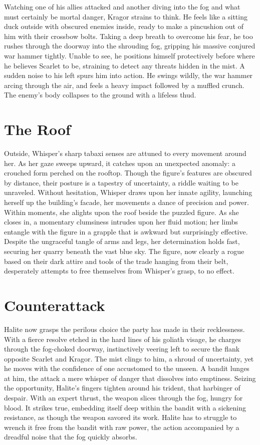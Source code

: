 \documentclass[
  12pt,twoside,twocolumn,openany,nodeprecatedcode]{dndbook}
\begin{document}
Watching one of his allies attacked and another diving into the fog and
what must certainly be mortal danger, Kragor strains to think. He feels
like a sitting duck outside with obscured enemies inside, ready to make
a pincushion out of him with their crossbow bolts. Taking a deep breath
to overcome his fear, he too rushes through the doorway into the
shrouding fog, gripping his massive conjured war hammer tightly. Unable
to see, he positions himself protectively before where he believes
Scarlet to be, straining to detect any threats hidden in the mist. A
sudden noise to his left spurs him into action. He swings wildly, the
war hammer arcing through the air, and feels a heavy impact followed by
a muffled crunch. The enemy's body collapses to the ground with a
lifeless thud.

\section{The Roof}\label{the-roof}

Outside, Whisper's sharp tabaxi senses are attuned to every movement
around her. As her gaze sweeps upward, it catches upon an unexpected
anomaly: a crouched form perched on the rooftop. Though the figure's
features are obscured by distance, their posture is a tapestry of
uncertainty, a riddle waiting to be unraveled. Without hesitation,
Whisper draws upon her innate agility, launching herself up the
building's facade, her movements a dance of precision and power. Within
moments, she alights upon the roof beside the puzzled figure. As she
closes in, a momentary clumsiness intrudes upon her fluid motion; her
limbs entangle with the figure in a grapple that is awkward but
surprisingly effective. Despite the ungraceful tangle of arms and legs,
her determination holds fast, securing her quarry beneath the vast blue
sky. The figure, now clearly a rogue based on their dark attire and
tools of the trade hanging from their belt, desperately attempts to free
themselves from Whisper's grasp, to no effect.

\section{Counterattack}\label{counterattack}

Halite now grasps the perilous choice the party has made in their
recklessness. With a fierce resolve etched in the hard lines of his
goliath visage, he charges through the fog-choked doorway, instinctively
veering left to secure the flank opposite Scarlet and Kragor. The mist
clings to him, a shroud of uncertainty, yet he moves with the confidence
of one accustomed to the unseen. A bandit lunges at him, the attack a
mere whisper of danger that dissolves into emptiness. Seizing the
opportunity, Halite's fingers tighten around his trident, that harbinger
of despair. With an expert thrust, the weapon slices through the fog,
hungry for blood. It strikes true, embedding itself deep within the
bandit with a sickening resistance, as though the weapon savored its
work. Halite has to struggle to wrench it free from the bandit with raw
power, the action accompanied by a dreadful noise that the fog quickly
absorbs.
\end{document}
